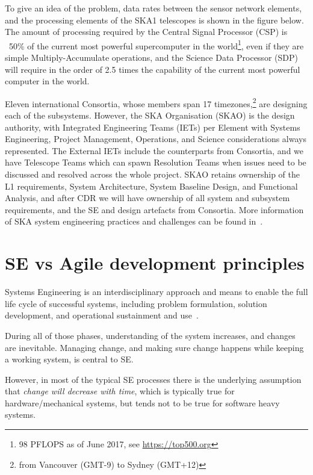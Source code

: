 \documentclass[11pt,twoside]{article}
\begin{document}
To give an idea of the problem, data rates between the sensor network elements, and the processing elements of the SKA1 telescopes is shown in the figure below. The amount of processing required by the Central Signal Processor (CSP) is ~50\% of the current most powerful supercomputer in the world\footnote{98 PFLOPS as of June 2017, see \url{https://top500.org}}, even if they are simple Multiply-Accumulate operations, and the Science Data Processor (SDP) will require in the order of 2.5 times the capability of the current most powerful computer in the world.

Eleven international Consortia, whose members span 17 timezones,\footnote{from Vancouver (GMT-9) to Sydney (GMT+12)} are designing each of the subsystems.
However, the SKA Organisation (SKAO) is the design authority, with Integrated Engineering Teams (IETs) per Element with Systems Engineering, Project Management, Operations, and Science considerations always represented. The External IETs include the counterparts from Consortia, and we have Telescope Teams which can spawn Resolution Teams when issues need to be discussed and resolved across the whole project.
SKAO retains ownership of the L1 requirements, System Architecture, System Baseline Design, and Functional Analysis, and after CDR we will have ownership of all system and subsystem requirements, and the SE and design artefacts from Consortia.
More information of SKA system engineering practices and challenges can be found in~\citep{2016SPIE.9911E..0WC}.


\section{SE vs Agile development principles} %
\label{sec:se_vs_agile_development_principles}
Systems Engineering is an interdisciplinary approach and means to enable the full life cycle of successful systems, including problem formulation, solution development, and operational sustainment and use~\citep{INCOSE-TP-2003-002-04}.

During all of those phases, understanding of the system increases, and changes are inevitable. Managing change, and making sure change happens while keeping a working system, is central to SE.

However, in most of the typical SE processes there is the underlying assumption that \emph{change will decrease with time}, which is typically true for hardware/mechanical systems, but tends not to be true for software heavy systems. 
\end{document}
